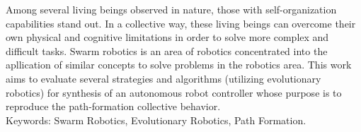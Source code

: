 Among several living beings observed in nature, those with self-organization capabilities stand out. In a collective way, these living beings can overcome their own physical and cognitive limitations in order to solve more complex and difficult tasks. Swarm robotics is an area of robotics concentrated into the apllication of similar concepts to solve problems in the robotics area. This work aims to evaluate several strategies and algorithms (utilizing evolutionary robotics) for synthesis of an autonomous robot controller whose purpose is to reproduce the path-formation collective behavior.\\

\noindent
Keywords: Swarm Robotics, Evolutionary Robotics, Path Formation.